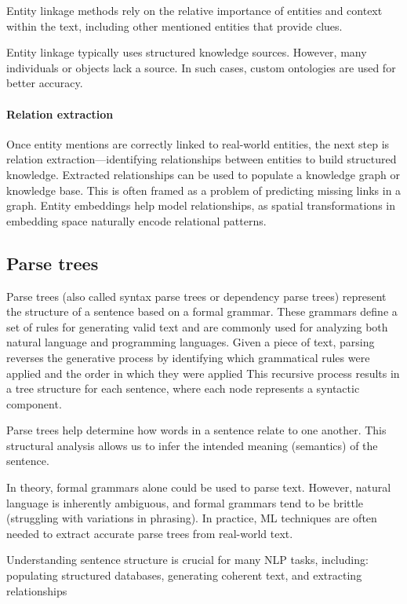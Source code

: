 Entity linkage methods rely on the relative importance of entities and context within the text, including other mentioned entities that provide clues.

Entity linkage typically uses structured knowledge sources. 
However, many individuals or objects lack a source. 
In such cases, custom ontologies are used for better accuracy.

\paragraph*{Relation extraction}
Once entity mentions are correctly linked to real-world entities, the next step is relation extraction—identifying relationships between entities to build structured knowledge.
Extracted relationships can be used to populate a knowledge graph or knowledge base.
This is often framed as a problem of predicting missing links in a graph.
Entity embeddings help model relationships, as spatial transformations in embedding space naturally encode relational patterns.

\subsection{Parse trees}
Parse trees (also called syntax parse trees or dependency parse trees) represent the structure of a sentence based on a formal grammar. 
These grammars define a set of rules for generating valid text and are commonly used for analyzing both natural language and programming languages.
Given a piece of text, parsing reverses the generative process by identifying which grammatical rules were applied and the order in which they were applied
This recursive process results in a tree structure for each sentence, where each node represents a syntactic component.

Parse trees help determine how words in a sentence relate to one another. 
This structural analysis allows us to infer the intended meaning (semantics) of the sentence.

In theory, formal grammars alone could be used to parse text.
However, natural language is inherently ambiguous, and formal grammars tend to be brittle (struggling with variations in phrasing). 
In practice, ML techniques are often needed to extract accurate parse trees from real-world text.

Understanding sentence structure is crucial for many NLP tasks, including: populating structured databases, generating coherent text, and extracting relationships

